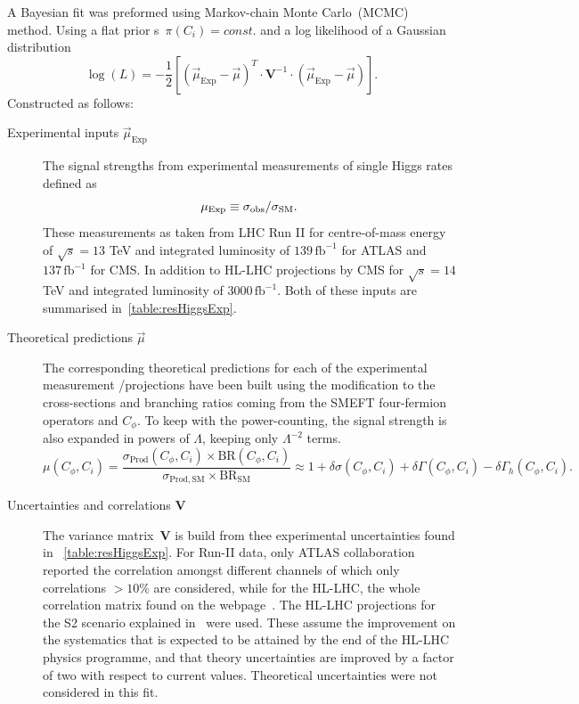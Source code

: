 	
	A Bayesian fit was preformed using Markov-chain Monte Carlo~(MCMC) method.   Using a flat prior s~$ \pi(C_i)= const.$ and a log likelihood of a Gaussian distribution 
	\begin{equation}
		\log(L) = -\frac{1}{2}\left[  (\vec{\mu}_{\mathrm{Exp}} -\vec{\mu} ) ^{T} \cdot \mathbf{V}^{-1} \cdot ( \vec{\mu}_{\mathrm{Exp}} -\vec{\mu} )\right]  .
		\label{eq:loglike}
	\end{equation}
	Constructed as follows:
	\begin{description}
		\item[Experimental inputs $\vec{\mu}_{\mathrm{Exp}}$ ] The signal strengths from experimental measurements of single Higgs rates defined as
		\begin{equation}
			\mu_{\mathrm{Exp}}\equiv \sigma_{\mathrm{obs}}/\sigma_{\mathrm{SM}}.
		\end{equation}
		These measurements as taken from LHC Run II for centre-of-mass energy of $\sqrt{s} = 13$ TeV and  integrated luminosity of $ 139\, \mathrm{fb}^{-1}$ for ATLAS and  $ 137\,\mathrm{fb}^{-1}$ for CMS. In addition to HL-LHC projections by CMS for $\sqrt{s} = 14$ TeV and integrated luminosity of $ 3000\, \mathrm{fb}^{-1}$. Both of these inputs are summarised in~\autoref{table:resHiggsExp}.
		\item [Theoretical predictions $\vec{\mu}$ ]  The corresponding theoretical predictions for each of the experimental measurement /projections have been built using the modification to the cross-sections and branching ratios coming from the SMEFT four-fermion operators and $C_\phi$. To keep with the power-counting, the signal strength is also expanded in powers of $\Lambda$, keeping only $ \Lambda^{-2}$ terms. 
		\begin{equation}
			\mu(C_\phi,C_i)=\frac{\sigma_\mathrm{ Prod}(C_\phi,C_i) \times \mathrm{ BR}(C_\phi,C_i)}{\sigma_\mathrm{ Prod, SM}\times \mathrm{BR}_\mathrm{ SM}} \approx 1+\delta \sigma(C_\phi,C_i)+\delta\Gamma(C_\phi,C_i)-\delta \Gamma_h(C_\phi,C_i).
			\label{linear-mu}
		\end{equation}
		\item [Uncertainties and correlations $\mathbf{V}$ ]  The variance matrix~$\mathbf{V}$ is build from thee experimental uncertainties found in ~\autoref{table:resHiggsExp}. For Run-II data, only ATLAS collaboration reported the correlation amongst different channels of which only correlations $> 10\%$ are considered, while for the HL-LHC, the whole correlation matrix found on the webpage~\cite{twiki}.  The HL-LHC projections for the S2 scenario explained in~\cite{Cepeda:2019klc} were used. These assume the improvement on the systematics that is expected to be attained by the end of the HL-LHC physics programme, and that theory uncertainties are improved by a factor of two with respect to current values. Theoretical uncertainties were not considered in this fit.
	\end{description}
